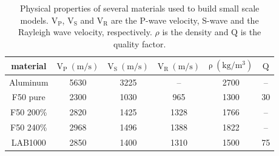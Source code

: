\documentclass[manuscript,revised]{geophysics}
\begin{document}
\begin{table}[!ht]
\centering
\begin{tabular}{cccccc}
\hline
material & $\mathrm{V_{P}\ (m/s)}$ & $\mathrm{V_{S}\ (m/s)}$ & $\mathrm{V_{R}\ (m/s)}$ & $\mathrm{\rho\ (kg/m^{3})}$ & $\mathrm{Q}$ \\
\hline
Aluminum & 5630 & 3225 & -- & 2700 & -- \\
F50 pure & 2300 & 1030 & 965 & 1300 & 30 \\
F50 200\% & 2820 & 1425 & 1328 & 1766 & -- \\
F50 240\% & 2968 & 1496 & 1388 & 1822 & -- \\
LAB1000 & 2850 & 1400 & 1310 & 1500 & 75 \\
\hline
\end{tabular}
\caption{Physical properties of several materials used to build small scale models. $\mathrm{V_{P}}$, $\mathrm{V_{S}}$ and $\mathrm{V_{R}}$ are the P-wave velocity, S-wave and the Rayleigh wave velocity, respectively. $\rho$ is the density and $\mathrm{Q}$ is the quality factor.}
\label{epoxy-resin}
\end{table}

% 

\end{document}

